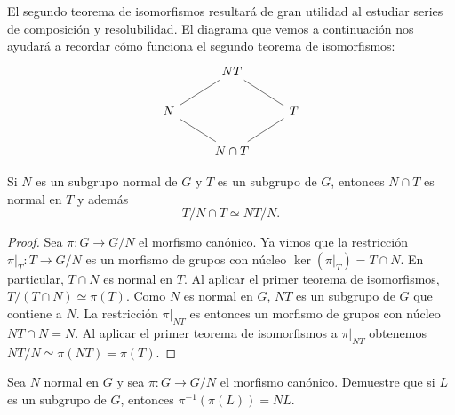 El segundo teorema de isomorfismos resultará de gran utilidad al estudiar series de composición y resolubilidad. 
El diagrama que vemos a continuación nos ayudará a recordar cómo funciona el segundo teorema de isomorfismos:
\[\begin{tikzcd}
	& NT \\
	N && T \\
	& {N\cap T}
	\arrow[no head, from=1-2, to=2-3]
	\arrow[no head, from=1-2, to=2-1]
	\arrow[no head, from=2-1, to=3-2]
	\arrow[no head, from=2-3, to=3-2]
\end{tikzcd}\]

\begin{theorem}
Si $N$ es un subgrupo normal de $G$ y $T$ es un subgrupo de $G$, entonces $N\cap T$ es normal en $T$ y además 
\[
T/N\cap T\simeq NT/N.
\]	
\end{theorem}

\begin{proof}
Sea $\pi\colon G\to G/N$ el morfismo canónico. Ya vimos que la restricción $\pi|_T\colon T\to G/N$ es un morfismo de grupos con núcleo
$\ker(\pi|_T)=T\cap N$. En particular, $T\cap N$ es normal en $T$. Al aplicar el primer
teorema de isomorfismos, $T/(T\cap N)\simeq \pi(T)$. Como $N$ es normal en $G$, 
$NT$ es un subgrupo de $G$ que contiene a $N$. 
La restricción $\pi|_{NT}$ es entonces un morfismo de grupos con núcleo $NT\cap N=N$.  
Al aplicar el primer teorema de isomorfismos a $\pi|_{NT}$ obtenemos
$NT/N\simeq \pi(NT)=\pi(T)$.  
\end{proof}

\begin{exercise}
Sea $N$ normal en $G$ y sea $\pi\colon G\to G/N$ el morfismo canónico. Demuestre que
si $L$ es un subgrupo de $G$, entonces $\pi^{-1}(\pi(L))=NL$. 
\end{exercise}

